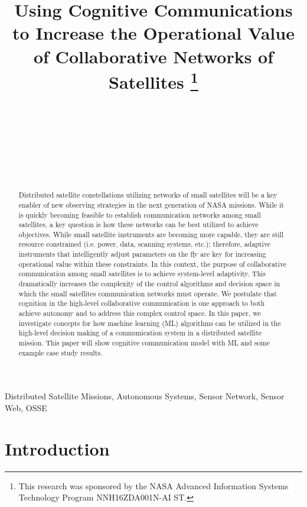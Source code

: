 \documentclass[conference]{IEEEtran}
\title{{Using Cognitive Communications to Increase the Operational Value of
    Collaborative Networks of Satellites}
  \thanks{This research was sponsored by the NASA Advanced Information Systems
    Technology Program NNH16ZDA001N-AI ST.}
}
\author{
   \IEEEauthorblockN{Ryan B. Linnabary}
   \IEEEauthorblockA{\thisplace linnabary.24@osu.edu}
   \and
   \IEEEauthorblockN{Andrew J. O'Brien}
   \IEEEauthorblockA{\thisplace obrien.200@osu.edu}
   \and
   \IEEEauthorblockN{Graeme E. Smith}
   \IEEEauthorblockA{\thisplace smith.8347@osu.edu}
   \and
   \IEEEauthorblockN{Christopher Ball}
   \IEEEauthorblockA{\thisplace ball.51@osu.edu}
   \and {~} \and {~~~~~~~~~~~~~~} \and
   \IEEEauthorblockN{Joel T. Johnson}
   \IEEEauthorblockA{\thisplace johnson.1374@osu.edu}
   \and {~~~~~~} \and {~~~~~~}
 }
\begin{document}
\maketitle


\begin{abstract}
Distributed satellite constellations utilizing networks of small satellites will
be a key enabler of new observing strategies in the next generation of NASA
missions.  While it is quickly becoming feasible to establish communication
networks among small satellites, a key question is how these networks can be
best utilized to achieve objectives.  While small satellite instruments are
becoming more capable, they are still resource constrained (i.e. power, data,
scanning systems, etc.); therefore, adaptive instruments that intelligently
adjust parameters on the fly are key for increasing operational value within
these constraints.  In this context, the purpose of collaborative communication
among small satellites is to achieve system-level adaptivity.  This dramatically
increases the complexity of the control algorithms and decision space in which
the small satellites communication networks must operate.  We postulate that
cognition in the high-level collaborative communication is one approach to both
achieve autonomy and to address this complex control space.  In this paper, we
investigate concepts for how machine learning (ML) algorithms can be utilized in
the high-level decision making of a communication system in a distributed
satellite mission.  This paper will show cognitive communication model with ML
and some example case study results.
\end{abstract}

\begin{IEEEkeywords}
Distributed Satellite Missions, Autonomous Systems, Sensor Network, Sensor Web,
OSSE
\end{IEEEkeywords}


\section{Introduction}
\label{sec:intro}
\end{document}
